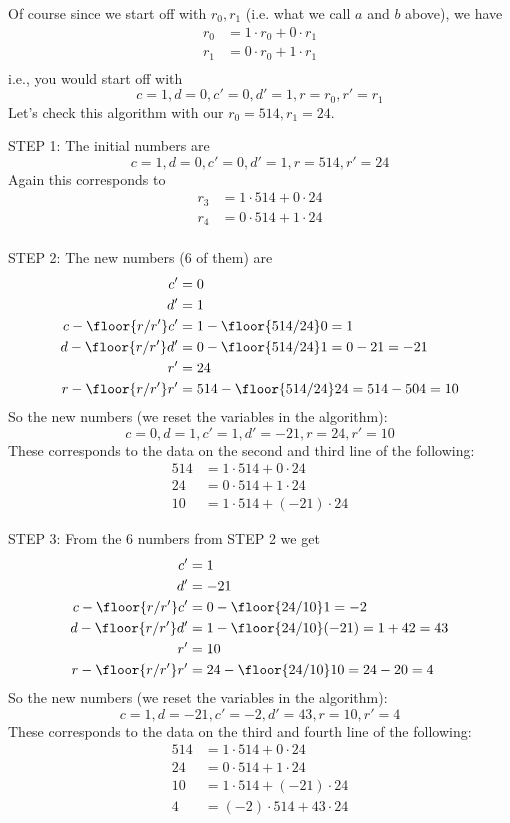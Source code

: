 Of course since we start off with $r_0, r_1$ (i.e. what we call $a$ and $b$
above), we have
\begin{align*}
r_0 &= 1 \cdot r_0 + 0 \cdot r_1 \\
r_1 &= 0 \cdot r_0 + 1 \cdot r_1 \\
\end{align*}
i.e., you would start off with
\[
c=1, d=0, c'=0, d'=1, r=r_0, r'=r_1
\]
Let's check this algorithm with our $r_0 = 514, r_1 = 24$.

STEP 1: The initial numbers are
\[
c=1, d=0, c'=0, d'=1, r=514, r'=24
\]
Again this corresponds to
\begin{align*}
r_3 &= 1 \cdot 514 + 0 \cdot 24  \\
r_4 &= 0 \cdot 514 + 1 \cdot 24 \\
\end{align*}

STEP 2: 
The new numbers (6 of them) are
\begin{align*}
 c' &=0 \\
 d' &=1 \\
 c - \floor{r/r'} c' &= 1 - \floor{514/24} 0 = 1\\
 d - \floor{r/r'}d' &= 0 - \floor{514/24}1 = 0 - 21 = -21 \\
 r' &= 24 \\ 
 r - \floor{r/r'}r' &= 514 - \floor{514/24}24 = 514 - 504 = 10
\end{align*}
So the new numbers (we reset the variables in the algorithm):
\[
c=0, d=1, c'=1, d'=-21, r=24, r'= 10
\]
These corresponds to the data on the second and third line of the following:
\begin{align*}
514 &= 1 \cdot 514 + 0 \cdot 24      \\
24  &= 0 \cdot 514 + 1 \cdot 24      \\
10  &= 1 \cdot 514 + (-21) \cdot 24 
\end{align*}

STEP 3: From the 6 numbers from STEP 2 we get
\begin{align*}
 c' &= 1 \\
 d' &= -21 \\
 c - \floor{r/r'} c' &= 0 - \floor{24/10} 1 = -2 \\
 d - \floor{r/r'}d'  &= 1 - \floor{24/10} (-21) = 1 + 42 = 43 \\
 r' &= 10 \\ 
 r - \floor{r/r'}r' &= 24 - \floor{24/10}10 = 24 - 20 = 4
\end{align*}
So the new numbers (we reset the variables in the algorithm):
\[
c=1, d=-21, c'=-2, d'= 43, r=10, r'= 4
\]
These corresponds to the data on the third and fourth line of the following:
\begin{align*}
514 &= 1 \cdot 514 + 0 \cdot 24     \\
24  &= 0 \cdot 514 + 1 \cdot 24     \\
10  &= 1 \cdot 514 + (-21) \cdot 24 \\
4   &= (-2) \cdot 514 + 43 \cdot 24 
\end{align*}

